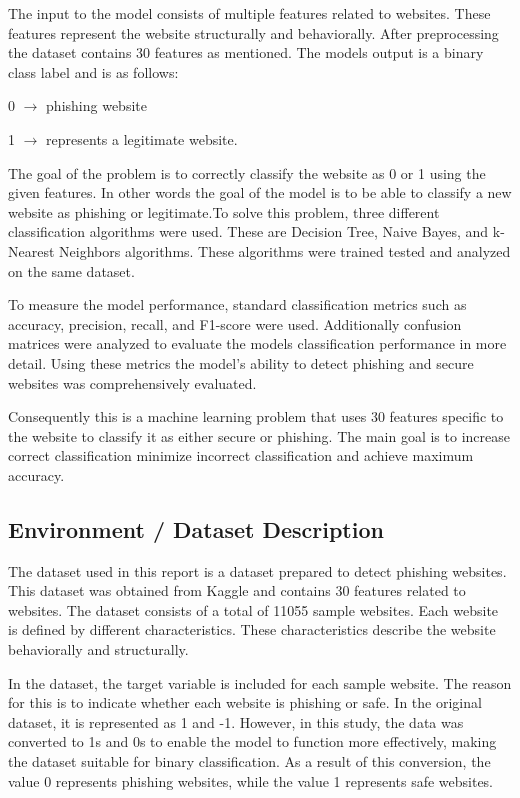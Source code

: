 \documentclass[conference]{IEEEtran}
\begin{document}
    The input to the model consists of multiple features related to websites. These features represent the website structurally and behaviorally. After preprocessing the dataset contains 30 features as mentioned. The models output is a binary class label and is as follows: 
    
0 $\rightarrow$ phishing website 


1 $\rightarrow$ represents a legitimate   website.

The goal of the problem is to correctly classify the website as 0 or 1 using the given features. In other words the goal of the model is to be able to classify a new website as phishing or legitimate.To solve this problem, three different classification algorithms were used.  These are Decision Tree, Naive Bayes, and k-Nearest Neighbors algorithms.  These algorithms were trained tested and analyzed on the same dataset.

    To measure the model performance, standard classification metrics such as accuracy, precision, recall, and F1-score were used. Additionally confusion matrices were analyzed to evaluate the models classification performance in more detail. Using these metrics the model's ability to detect phishing and secure websites was comprehensively evaluated.

    Consequently this is a machine learning problem that uses 30 features specific to the website to classify it as either secure or phishing. The main goal is to increase correct classification minimize incorrect classification and achieve maximum accuracy.

    
	\subsection{Environment / Dataset Description}
	    The dataset used in this report is a dataset prepared to detect phishing websites. This dataset was obtained from Kaggle and contains 30 features related to websites. The dataset consists of a total of 11055 sample websites. Each website is defined by different characteristics. These characteristics describe the website behaviorally and structurally.

    In the dataset, the target variable is included for each sample website. The reason for this is to indicate whether each website is phishing or safe. In the original dataset, it is represented as 1 and -1. However, in this study, the data was converted to 1s and 0s to enable the model to function more effectively, making the dataset suitable for binary classification. As a result of this conversion, the value 0 represents phishing websites, while the value 1 represents safe websites.
\end{document}
